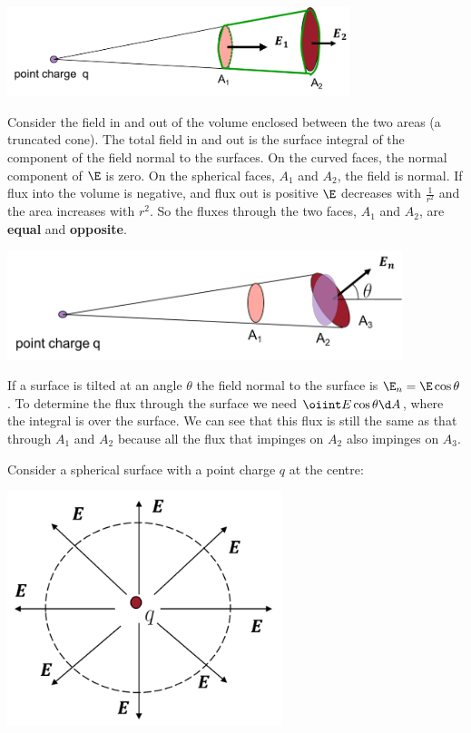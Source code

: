\documentclass[
]{book}
\begin{document}
\includegraphics[width=100mm,height=\textheight]{Figures/elecFlux1.png} \protect\hypertarget{fig:elecFlux1}{}{}

Consider the field in and out of the volume enclosed between the two
areas (a truncated cone). The total field in and out is the surface
integral of the component of the field normal to the surfaces. On the
curved faces, the normal component of \(\E\) is zero. On the spherical
faces, \(A_1\) and \(A_2\), the field is normal. If flux into the volume is
negative, and flux out is positive \(\E\) decreases with \(\frac{1}{r^2}\)
and the area increases with \(r^2\). So the fluxes through the two faces,
\(A_1\) and \(A_2\), are \textbf{equal} and \textbf{opposite}.

\includegraphics[width=115mm,height=\textheight]{Figures/elecFlux2.png} \protect\hypertarget{fig:elecFlux2}{}{}

If a surface is tilted at an angle \(\theta\) the field normal to the
surface is \(\E_n = \E \cos\theta\). To determine the flux through the
surface we need \(\oiint E \cos\theta \d A\), where the integral is over
the surface. We can see that this flux is still the same as that through
\(A_1\) and \(A_2\) because all the flux that impinges on \(A_2\) also
impinges on \(A_3\).

Consider a spherical surface with a point charge \(q\) at the centre:

\includegraphics[width=80mm,height=\textheight]{Figures/elecFlux3.png} \protect\hypertarget{fig:elecFlux3}{}{}
\end{document}
